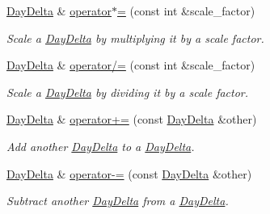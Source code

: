 \begin{DoxyCompactItemize}
\hyperlink{structDayDelta}{Day\-Delta} \& \hyperlink{structDayDelta_a4312a7090a3365dc3646f91f44ae7654}{operator$\ast$=} (const int \&scale\-\_\-factor)
\begin{DoxyCompactList}\small\item\em Scale a \hyperlink{structDayDelta}{Day\-Delta} by multiplying it by a scale factor. \end{DoxyCompactList}\item 
\hyperlink{structDayDelta}{Day\-Delta} \& \hyperlink{structDayDelta_a892e28fb54b113684d1f5078d6f607c8}{operator/=} (const int \&scale\-\_\-factor)
\begin{DoxyCompactList}\small\item\em Scale a \hyperlink{structDayDelta}{Day\-Delta} by dividing it by a scale factor. \end{DoxyCompactList}\item 
\hyperlink{structDayDelta}{Day\-Delta} \& \hyperlink{structDayDelta_a081325e9acba450f7446d1d59ed65518}{operator+=} (const \hyperlink{structDayDelta}{Day\-Delta} \&other)
\begin{DoxyCompactList}\small\item\em Add another \hyperlink{structDayDelta}{Day\-Delta} to a \hyperlink{structDayDelta}{Day\-Delta}. \end{DoxyCompactList}\item 
\hyperlink{structDayDelta}{Day\-Delta} \& \hyperlink{structDayDelta_a886f81ff8427ad7712a246fcd3b139f7}{operator-\/=} (const \hyperlink{structDayDelta}{Day\-Delta} \&other)
\begin{DoxyCompactList}\small\item\em Subtract another \hyperlink{structDayDelta}{Day\-Delta} from a \hyperlink{structDayDelta}{Day\-Delta}. \end{DoxyCompactList}\end{DoxyCompactItemize}
